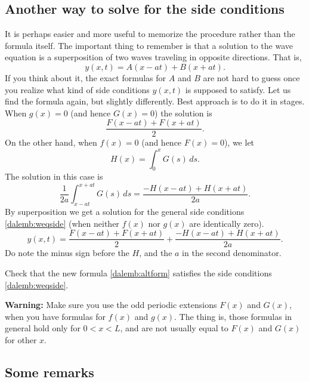 \subsection{Another way to solve for the side conditions}

It is perhaps easier and more useful
to memorize the procedure rather than the formula
itself.  The important thing to remember is that a solution to the wave
equation is a superposition of two waves traveling in opposite directions.
That is,
\begin{equation*}
y(x,t) = A(x-at) + B(x+at) .
\end{equation*}
If you think about it, the exact formulas for $A$ and $B$ are not hard
to guess once you realize what kind of side conditions $y(x,t)$ is supposed to
satisfy.  Let us find the formula again, but slightly differently.
Best approach is to do it in stages.  When $g(x) = 0$ (and hence
$G(x) = 0$) the solution is
\begin{equation*}
\frac{ F(x-at) + F(x+at) }{2} .
\end{equation*}
On the other hand,
when $f(x) = 0$ (and hence $F(x) = 0$), we let
\begin{equation*}
H(x) = \int_0^x G(s) \,ds .
\end{equation*}
The solution in this case is
\begin{equation*}
\frac{1}{2a} \int_{x-at}^{x+at} G(s) \,ds
=
\frac{ -H(x-at) + H(x+at) }{2a} .
\end{equation*}
By superposition we get a solution for the general side conditions
\eqref{dalemb:weqside} (when neither $f(x)$ nor $g(x)$ are identically zero).
\begin{equation} \label{dalemb:altform}
y(x,t) = \frac{ F(x-at) + F(x+at) }{2} +
\frac{ -H(x-at) + H(x+at) }{2a} .
\end{equation}
Do note the minus sign before the $H$, and the $a$ in the second denominator.

\begin{exercise}
Check that the new formula \eqref{dalemb:altform} satisfies
the side conditions
\eqref{dalemb:weqside}.
\end{exercise}

\textbf{Warning:}
Make sure you use the odd periodic extensions $F(x)$ and $G(x)$,
when you have formulas for $f(x)$ and $g(x)$.
The thing is, those formulas in general hold
only for $0 < x < L$, and are not usually equal to $F(x)$ and $G(x)$
for other $x$.

\subsection{Some remarks}

